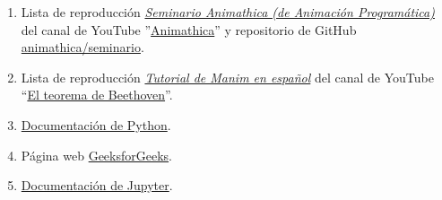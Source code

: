 \documentclass[a4paper]{article}
\begin{document}
\begin{enumerate}

\item Lista de reproducción \href{https://www.youtube.com/watch?v=-VJ7h8-GbHU&list=PL91agCMqt_mfPlTgR8zmguMZIpGV0Jflj&ab_channel=Animathica}{\emph{Seminario Animathica (de Animación Programática)}} del canal de YouTube ''\href{https://www.youtube.com/channel/UCzkyH2bxpesubzc87VxqDiA}{Animathica}'' y repositorio de GitHub \href{https://github.com/animathica/seminario}{animathica/seminario}.

\item Lista de reproducción \href{https://www.youtube.com/playlist?list=PLcjmqHFN9VeMC9znnNiRMv3nqZv-bU9Fo}{\emph{Tutorial de Manim en español}} del canal de YouTube ``\href{https://www.youtube.com/channel/UCmFww1CGIFsvujZ0zNzcLQw}{El teorema de Beethoven}''.

    \item \href{https://www.python.org/doc/}{Documentación de Python}.

    \item Página web \href{https://www.geeksforgeeks.org/python-programming-language/}{GeeksforGeeks}.

    \item \href{https://docs.jupyter.org/en/latest/}{Documentación de Jupyter}.
\end{enumerate}
\end{document}
